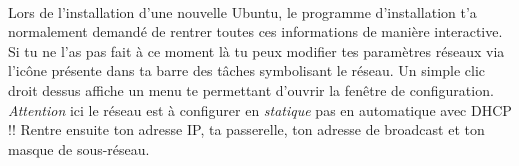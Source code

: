 \paragraph{}
\label{Ubuntu:IP}

Lors de l'installation d'une nouvelle Ubuntu, le programme d'installation t'a normalement demand\'e de rentrer toutes ces informations de mani\`ere
interactive. Si tu ne l'as pas fait \`a ce moment l\`a tu peux modifier tes paramètres réseaux via l'ic\^one pr\'esente dans ta barre des t\^aches symbolisant
le r\'eseau. Un simple clic droit dessus affiche un menu te permettant d'ouvrir la fenêtre de configuration. \emph{Attention} ici le r\'eseau est \`a configurer en
\emph{statique} pas en automatique avec DHCP !! Rentre ensuite ton adresse IP, ta passerelle, ton adresse de broadcast et ton masque de sous-r\'eseau.

